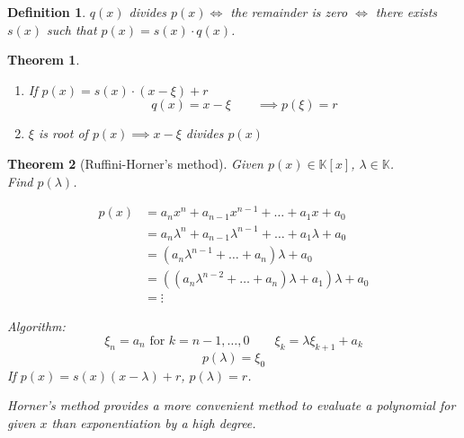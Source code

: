 \documentclass{article}
\newtheorem{theorem}{Theorem}  \numberwithin{theorem}{section}
\newtheorem{definition}{Definition}  \numberwithin{definition}{section}
\begin{document}
\begin{definition} %
  $q(x)$ \emph{divides} $p(x) \iff $ the remainder is zero
  $\iff$ there exists $s(x)$ such that $p(x) = s(x) \cdot q(x)$.
\end{definition}

\begin{theorem} %
  \begin{enumerate}
    \item If $p(x) = s(x) \cdot (x - \xi) + r$
      \[ q(x) = x - \xi \qquad \implies p(\xi) = r \]
    \item $\xi$ is root of $p(x) \implies x - \xi$ divides $p(x)$
  \end{enumerate}
\end{theorem}

\begin{theorem}[Ruffini-Horner's method]
  Given $p(x) \in \mathbb K[x]$, $\lambda \in \mathbb K$. \\
  Find $p(\lambda)$.

  \begin{align*}
    p(x) &= a_n x^n + a_{n-1} x^{n-1} + \dots + a_1 x + a_0 \\
      &= a_n \lambda^n + a_{n-1} \lambda^{n-1} + \ldots + a_1 \lambda + a_0 \\
      &= \left(a_n \lambda^{n-1} + \dots + a_n\right) \lambda + a_0 \\
      &= \left((a_n \lambda^{n-2} + \dots + a_n) \lambda + a_1\right) \lambda + a_0 \\
      &= \vdots
  \end{align*}

  Algorithm:
  \[ \xi_n = a_n \text{ for } k = n-1, \dots, 0 \qquad \xi_k = \lambda \xi_{k+1} + a_k \]
  \[ p(\lambda) = \xi_0 \]
  If $p(x) = s(x) (x - \lambda) + r$, $p(\lambda) = r$.

  Horner's method provides a more convenient method to evaluate a polynomial for given $x$
  than exponentiation by a high degree.
\end{theorem}
\end{document}
